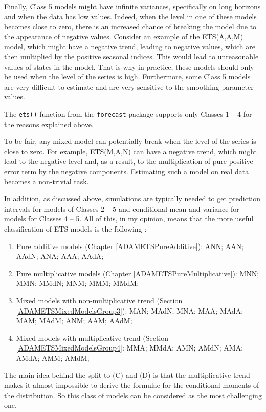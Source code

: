 \documentclass[]{book}
\providecommand{\tightlist}{%
  \setlength{\itemsep}{0pt}\setlength{\parskip}{0pt}}
\theoremstyle{definition}
\theoremstyle{definition}
\theoremstyle{definition}
\theoremstyle{definition}
\theoremstyle{remark}
\begin{document}
Finally, Class 5 models might have infinite variances, specifically on long horizons and when the data has low values. Indeed, when the level in one of these models becomes close to zero, there is an increased chance of breaking the model due to the appearance of negative values. Consider an example of the ETS(A,A,M) model, which might have a negative trend, leading to negative values, which are then multiplied by the positive seasonal indices. This would lead to unreasonable values of states in the model. That is why in practice, these models should only be used when the level of the series is high. Furthermore, some Class 5 models are very difficult to estimate and are very sensitive to the smoothing parameter values.

The \texttt{ets()} function from the \texttt{forecast} package supports only Classes 1 -- 4 for the reasons explained above.

To be fair, any mixed model can potentially break when the level of the series is close to zero. For example, ETS(M,A,N) can have a negative trend, which might lead to the negative level and, as a result, to the multiplication of pure positive error term by the negative components. Estimating such a model on real data becomes a non-trivial task.

In addition, as discussed above, simulations are typically needed to get prediction intervals for models of Classes 2 -- 5 and conditional mean and variance for models for Classes 4 -- 5. All of this, in my opinion, means that the more useful classification of ETS models is the following \citep[this classification was first proposed by][]{Akram2009}:

\begin{enumerate}
\def\labelenumi{\Alph{enumi})}
\tightlist
\item
  Pure additive models (Chapter \ref{ADAMETSPureAdditive}): ANN; AAN; AAdN; ANA; AAA; AAdA;
\item
  Pure multiplicative models (Chapter \ref{ADAMETSPureMultiplicative}): MNN; MMN; MMdN; MNM; MMM; MMdM;
\item
  Mixed models with non-multiplicative trend (Section \ref{ADAMETSMixedModelsGroup3}): MAN; MAdN; MNA; MAA; MAdA; MAM; MAdM; ANM; AAM; AAdM;
\item
  Mixed models with multiplicative trend (Section \ref{ADAMETSMixedModelsGroup4}: MMA; MMdA; AMN; AMdN; AMA; AMdA; AMM; AMdM;
\end{enumerate}

The main idea behind the split to (C) and (D) is that the multiplicative trend makes it almost impossible to derive the formulae for the conditional moments of the distribution. So this class of models can be considered as the most challenging one.
\end{document}
